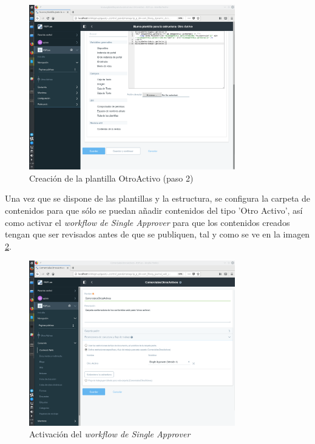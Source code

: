 \begin{figure}[H]
\begin{center}
\includegraphics[width=0.8\textwidth]{./img/liferay/11.png}
\end{center}
\caption{Creación de la plantilla OtroActivo (paso 2)}
\label{img:lr11}
\end{figure}

\par Una vez que se dispone de las plantillas y la estructura, se configura la carpeta de contenidos para que sólo se puedan añadir contenidos del tipo 'Otro Activo', así como activar el \textit{workflow de Single Approver} para que los contenidos creados tengan que ser revisados antes de que se publiquen, tal y como se ve en la imagen \ref{img:lr12}.

\begin{figure}[H]
\begin{center}
\includegraphics[width=0.8\textwidth]{./img/liferay/12.png}
\end{center}
\caption{Activación del \textit{workflow de Single Approver}}
\label{img:lr12}
\end{figure}

